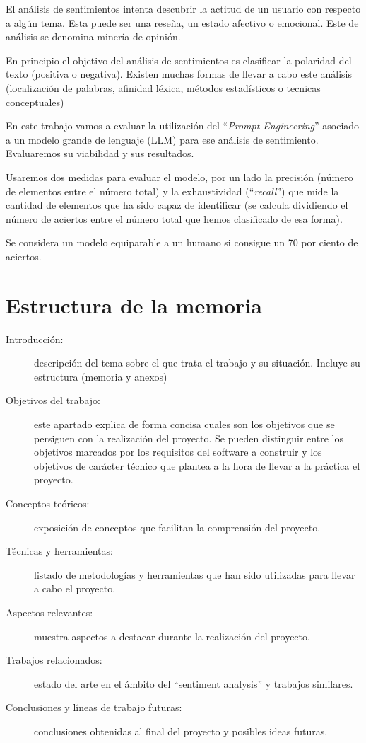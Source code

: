 
El análisis de sentimientos intenta descubrir la actitud de un usuario 
con respecto a algún tema.
Esta puede ser una reseña, un estado afectivo o emocional. 
Este de análisis se denomina minería de opinión.

En principio el objetivo del análisis de sentimientos es 
clasificar la polaridad del texto (positiva o negativa).
Existen muchas formas de llevar a cabo este análisis (localización de palabras, 
afinidad léxica, métodos estadísticos o tecnicas conceptuales)~\cite{Bannister2015}

En este trabajo vamos a evaluar la utilización del ``\emph{Prompt Engineering}'' 
asociado a un modelo grande de lenguaje (LLM) para ese análisis de sentimiento.
Evaluaremos su viabilidad y sus resultados. 

Usaremos dos medidas para evaluar el modelo, 
por un lado la precisión (número de elementos entre el número total) 
y la exhaustividad (``\emph{recall}'') que mide la cantidad de elementos 
que ha sido capaz de identificar 
(se calcula dividiendo el número de aciertos entre el número 
total que hemos clasificado de esa forma).

Se considera un modelo equiparable a un humano si consigue un 70 por ciento de aciertos.~\cite{Saif2013}
\newpage
\section{Estructura de la memoria}
\begin{description}
	\item[Introducción:] descripción del tema sobre el que trata el trabajo y su situación. 
    Incluye su estructura (memoria y anexos)
	\item[Objetivos del trabajo:] este apartado explica de forma concisa cuales son los objetivos 
    que se persiguen con la realización del proyecto. 
    Se pueden distinguir entre los objetivos marcados por los requisitos del software a construir y
     los objetivos de carácter técnico que plantea a la hora de llevar a la práctica el proyecto.
    \item[Conceptos teóricos:] exposición de conceptos que facilitan la comprensión del proyecto.
    \item[Técnicas y herramientas:] listado de metodologías y herramientas que han sido 
    utilizadas para llevar a cabo el proyecto.
    \item[Aspectos relevantes:] muestra aspectos a destacar durante la realización del proyecto.
    \item[Trabajos relacionados:] estado del arte en el ámbito del ``sentiment analysis'' y trabajos similares.
    \item[Conclusiones y líneas de trabajo futuras:] conclusiones obtenidas al final del proyecto y posibles ideas futuras.
\end{description}
